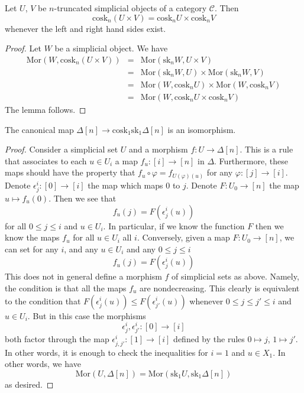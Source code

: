 \begin{lemma}
\label{lemma-cosk-product}
Let $U$, $V$ be $n$-truncated simplicial objects of a
category $\mathcal{C}$. Then
$$
\text{cosk}_n (U \times V) = \text{cosk}_nU \times \text{cosk}_nV
$$
whenever the left and right hand sides exist.
\end{lemma}

\begin{proof}
Let $W$ be a simplicial object. We have
\begin{eqnarray*}
\text{Mor}(W, \text{cosk}_n (U \times V))
& = &
\text{Mor}(\text{sk}_n W, U \times V) \\
& = &
\text{Mor}(\text{sk}_n W, U)
\times
\text{Mor}(\text{sk}_nW, V) \\
& = &
\text{Mor}(W, \text{cosk}_n U)
\times
\text{Mor}(W, \text{cosk}_n V) \\
& = &
\text{Mor}(W, \text{cosk}_n U \times \text{cosk}_n V)
\end{eqnarray*}
The lemma follows.
\end{proof}

\begin{lemma}
\label{lemma-simplex-cosk}
The canonical map
$\Delta[n] \to \text{cosk}_1 \text{sk}_1 \Delta[n]$
is an isomorphism.
\end{lemma}

\begin{proof}
Consider a simplicial set $U$ and a morphism
$f : U \to \Delta[n]$. This is a rule that associates
to each $u \in U_i$ a map $f_u : [i] \to [n]$ in $\Delta$.
Furthermore, these maps should have the property that
$f_u \circ \varphi = f_{U(\varphi)(u)}$ for any 
$\varphi : [j] \to [i]$. Denote $\epsilon^i_j : [0] \to [i]$
the map which maps $0$ to $j$. Denote $F : U_0 \to [n]$
the map $u \mapsto f_u(0)$. Then we see that
$$
f_u(j) = F(\epsilon^i_j(u))
$$
for all $0 \leq j \leq i$ and $u \in U_i$.
In particular, if we know the function $F$
then we know the maps $f_u$ for all $u\in U_i$ all $i$.
Conversely, given a map $F : U_0 \to [n]$,
we can set for any $i$, and any $u \in U_i$ 
and any $0 \leq j \leq i$
$$
f_u(j) = F(\epsilon^i_j(u))
$$
This does not in general define a morphism $f$ of simplicial sets
as above. Namely, the condition is that all the maps $f_u$ are
nondecreasing. This clearly is equivalent to the condition
that $F(\epsilon^i_j(u)) \leq F(\epsilon^i_{j'}(u))$
whenever $0 \leq j \leq j' \leq i$ and $u \in U_i$. But in this
case the morphisms
$$
\epsilon^i_j, \epsilon^i_{j'} : [0] \to [i]
$$
both factor through the map
$\epsilon^i_{j, j'} : [1] \to [i]$ defined by the rules
$0 \mapsto j$, $1 \mapsto j'$.
In other words, it is enough to check the inequalities for
$i = 1$ and $u \in X_1$. In other words, we have
$$
\text{Mor}(U, \Delta[n])
=
\text{Mor}(\text{sk}_1 U, \text{sk}_1 \Delta[n])
$$
as desired.
\end{proof}






